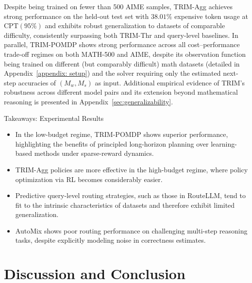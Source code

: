 \documentclass{article}
\theoremstyle{plain}
\theoremstyle{definition}
\theoremstyle{remark}
\begin{document}
Despite being trained on fewer than 500 AIME samples, TRIM-Agg achieves strong performance on the held-out test set with $38.01\%$ expensive token usage at $\mathrm{CPT}(95\%)$ and exhibits robust generalization to datasets of comparable difficulty, consistently surpassing both TRIM-Thr and query-level baselines. In parallel, TRIM-POMDP shows strong performance across all cost–performance trade-off regimes on both MATH-500 and AIME, despite its observation function being trained on different (but comparably difficult) math datasets (detailed in Appendix~\ref{appendix: setup}) and the solver requiring only the estimated next-step accuracies of $(M_w, M_s)$ as input. Additional empirical evidence of TRIM’s robustness across different model pairs and its extension beyond mathematical reasoning is presented in Appendix~\ref{sec:generalizability}.
\begin{AIbox}{Takeaways: Experimental Results}
\begin{itemize}[leftmargin=*, topsep=0pt, itemsep=0.1em, parsep=0pt, partopsep=0pt]
\item In the low-budget regime, TRIM-POMDP  shows superior performance, highlighting the benefits of principled long-horizon planning over learning-based methods under sparse-reward dynamics.
\item TRIM-Agg policies are more effective in the high-budget regime, where policy optimization via RL becomes considerably easier.
\item Predictive query-level routing strategies, such as those in RouteLLM, tend to fit to the intrinsic characteristics of datasets and therefore exhibit limited generalization.
\item AutoMix shows poor routing performance on challenging multi-step reasoning tasks, despite explicitly modeling noise in correctness estimates.
\end{itemize}
\end{AIbox}
\vspace{-0.4cm}
\section{Discussion and Conclusion}
\vspace{-0.2cm}
\end{document}
